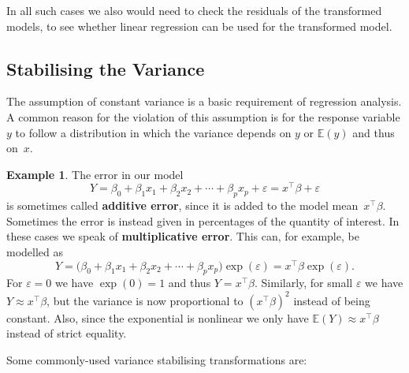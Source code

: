 \documentclass[
  a4paper,
]{article}
\theoremstyle{definition}
\theoremstyle{definition}
\newtheorem{example}{Example}[section]
\theoremstyle{definition}
\theoremstyle{definition}
\theoremstyle{remark}
\begin{document}
In all such cases we also would need to check the residuals of the transformed
models, to see whether linear regression can be used for the transformed model.

\hypertarget{stabilising-the-variance}{%
\subsection{Stabilising the Variance}\label{stabilising-the-variance}}

The assumption of constant variance is a basic requirement of regression
analysis. A common reason for the violation of this assumption is for the
response variable \(y\) to follow a distribution in which the variance depends
on \(y\) or \(\mathbb{E}(y)\) and thus on~\(x\).

\begin{example}
The error in our model
\begin{equation*}
  Y
  = \beta_0 + \beta_1 x_1 + \beta_2 x_2 + \cdots + \beta_p x_p + \varepsilon
  = x^\top \beta + \varepsilon
\end{equation*}
is sometimes called \textbf{additive error}, since it is added to the model
mean~\(x^\top\beta\). Sometimes the error is instead given in percentages of the
quantity of interest. In these cases we speak of \textbf{multiplicative error}.
This can, for example, be modelled as
\begin{equation*}
  Y
  = \bigl(\beta_0 + \beta_1 x_1 + \beta_2 x_2 + \cdots + \beta_p x_p\bigr) \exp(\varepsilon)
  = x^\top \beta \exp(\varepsilon).
\end{equation*}
For \(\varepsilon= 0\) we have \(\exp(0) = 1\) and thus \(Y = x^\top \beta\). Similarly,
for small \(\varepsilon\) we have \(Y \approx x^\top \beta\), but the variance is now
proportional to \((x^\top\beta)^2\) instead of being constant. Also, since the
exponential is nonlinear we only have \(\mathbb{E}(Y) \approx x^\top\beta\) instead of
strict equality.
\end{example}

Some commonly-used variance stabilising transformations are:
\end{document}
